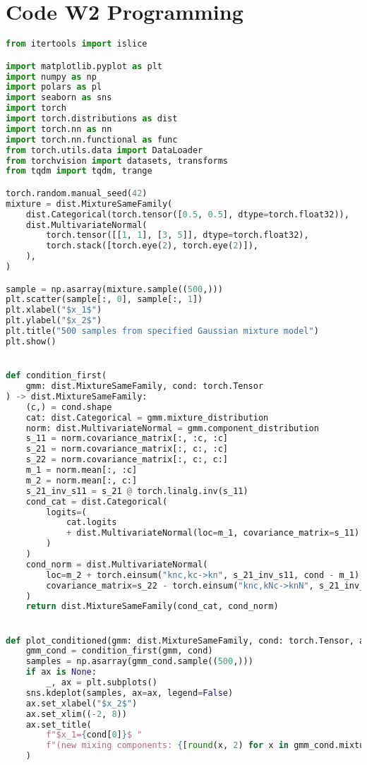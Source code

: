 \documentclass[11pt]{article} %
\begin{document}
\section{Code W2 Programming}
\label{code_w2}
\begin{lstlisting}[language=Python]
from itertools import islice

import matplotlib.pyplot as plt
import numpy as np
import polars as pl
import seaborn as sns
import torch
import torch.distributions as dist
import torch.nn as nn
import torch.nn.functional as func
from torch.utils.data import DataLoader
from torchvision import datasets, transforms
from tqdm import tqdm, trange

torch.random.manual_seed(42)
mixture = dist.MixtureSameFamily(
    dist.Categorical(torch.tensor([0.5, 0.5], dtype=torch.float32)),
    dist.MultivariateNormal(
        torch.tensor([[1, 1], [3, 5]], dtype=torch.float32),
        torch.stack([torch.eye(2), torch.eye(2)]),
    ),
)

sample = np.asarray(mixture.sample((500,)))
plt.scatter(sample[:, 0], sample[:, 1])
plt.xlabel("$x_1$")
plt.ylabel("$x_2$")
plt.title("500 samples from specified Gaussian mixture model")
plt.show()


def condition_first(
    gmm: dist.MixtureSameFamily, cond: torch.Tensor
) -> dist.MixtureSameFamily:
    (c,) = cond.shape
    cat: dist.Categorical = gmm.mixture_distribution
    norm: dist.MultivariateNormal = gmm.component_distribution
    s_11 = norm.covariance_matrix[:, :c, :c]
    s_21 = norm.covariance_matrix[:, c:, :c]
    s_22 = norm.covariance_matrix[:, c:, c:]
    m_1 = norm.mean[:, :c]
    m_2 = norm.mean[:, c:]
    s_21_inv_s11 = s_21 @ torch.linalg.inv(s_11)
    cond_cat = dist.Categorical(
        logits=(
            cat.logits
            + dist.MultivariateNormal(loc=m_1, covariance_matrix=s_11).log_prob(cond)
        )
    )
    cond_norm = dist.MultivariateNormal(
        loc=m_2 + torch.einsum("knc,kc->kn", s_21_inv_s11, cond - m_1),
        covariance_matrix=s_22 - torch.einsum("knc,kNc->knN", s_21_inv_s11, s_21),
    )
    return dist.MixtureSameFamily(cond_cat, cond_norm)


def plot_conditioned(gmm: dist.MixtureSameFamily, cond: torch.Tensor, ax=None):
    gmm_cond = condition_first(gmm, cond)
    samples = np.asarray(gmm_cond.sample((500,)))
    if ax is None:
        _, ax = plt.subplots()
    sns.kdeplot(samples, ax=ax, legend=False)
    ax.set_xlabel("$x_2$")
    ax.set_xlim((-2, 8))
    ax.set_title(
        f"$x_1={cond[0]}$ "
        f"(new mixing components: {[round(x, 2) for x in gmm_cond.mixture_distribution.probs.tolist()]})"
    )



\end{lstlisting}
\end{document}
